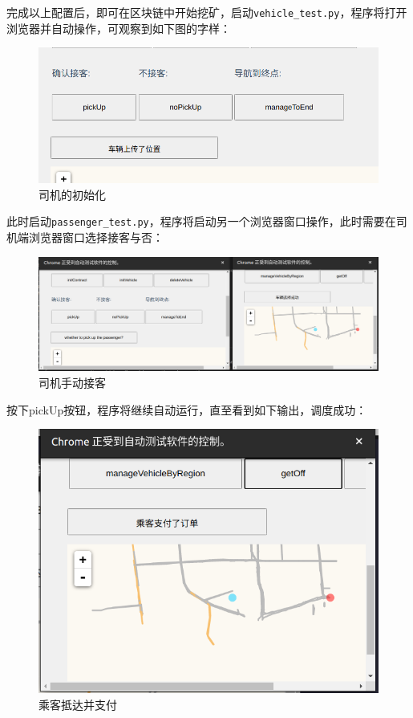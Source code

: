 完成以上配置后，即可在区块链中开始挖矿，启动\verb|vehicle_test.py|，程序将打开浏览器并自动操作，可观察到如下图的字样：

\begin{figure}[htbp]
    \centering
    \includegraphics[width=\textwidth]{images/vehicleInit.png}
    \caption{司机的初始化}\label{司机的初始化} %
\end{figure}

此时启动\verb|passenger_test.py|，程序将启动另一个浏览器窗口操作，此时需要在司机端浏览器窗口选择接客与否：

\begin{figure}[htbp]
    \centering
    \includegraphics[width=\textwidth]{images/pickUp.png}
    \caption{司机手动接客}\label{司机手动接客} %
\end{figure}

按下pickUp按钮，程序将继续自动运行，直至看到如下输出，调度成功：

\begin{figure}[htbp]
    \centering
    \includegraphics[width=\textwidth]{images/passengerPay.png}
    \caption{乘客抵达并支付}\label{司机手动接乘客抵达并支付客} %
\end{figure}


